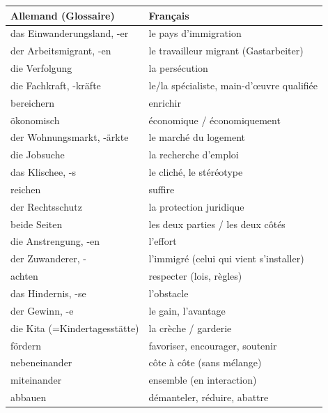\documentclass[11pt]{article}
\newcommand{\cle}[1]{{\popxbold\color{popdark}#1}}
\begin{document}
\begin{center}
\begin{tabularx}{\linewidth}{|X|X|}
\hline
\rowcolor{popblueL}
\textbf{Allemand (Glossaire)} & \textbf{Français} \\
\hline
\cle{das Einwanderungsland, -er} & le pays d'immigration \\
\cle{der Arbeitsmigrant, -en} & le travailleur migrant (Gastarbeiter) \\
\cle{die Verfolgung} & la persécution \\
\cle{die Fachkraft, -kräfte} & le/la spécialiste, main-d'œuvre qualifiée \\
\cle{bereichern} & enrichir \\
\cle{ökonomisch} & économique / économiquement \\
\cle{der Wohnungsmarkt, -\"{a}rkte} & le marché du logement \\
\cle{die Jobsuche} & la recherche d'emploi \\
\cle{das Klischee, -s} & le cliché, le stéréotype \\
\cle{reichen} & suffire \\
\cle{der Rechtsschutz} & la protection juridique \\
\cle{beide Seiten} & les deux parties / les deux côtés \\
\cle{die Anstrengung, -en} & l'effort \\
\cle{der Zuwanderer, -} & l'immigré (celui qui vient s'installer) \\
\cle{achten} & respecter (lois, règles) \\
\cle{das Hindernis, -se} & l'obstacle \\
\cle{der Gewinn, -e} & le gain, l'avantage \\
\cle{die Kita} (=\cle{Kindertagesstätte}) & la crèche / garderie \\
\cle{fördern} & favoriser, encourager, soutenir \\
\cle{nebeneinander} & côte à côte (sans mélange) \\
\cle{miteinander} & ensemble (en interaction) \\
\cle{abbauen} & démanteler, réduire, abattre \\
\hline
\end{tabularx}
\end{center}
\end{document}
